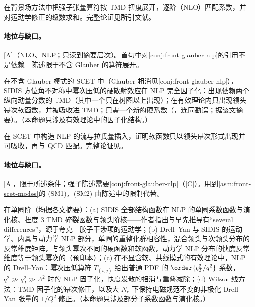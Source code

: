 \begin{proofsketch}
在背景场方法中把强子张量算符按 TMD 扭度展开，逐阶（NLO）匹配系数，并对运动学修正的级数求和。完整论证见所引文献。
\end{proofsketch}

\paragraph{地位与缺口。}[A]（NLO、NLP；只读到摘要层次）。首句中对\cref{conj:front-glauber-nlp}的引用不是依赖：陈述限于不含 Glauber 的算符展开。

\begin{proposition}\label{prop:front-sidis-nlp}
在不含 Glauber 模式的 SCET 中（Glauber 相消见\cref{conj:front-glauber-nlp}），SIDIS 方位角不对称中幂次压低的硬散射效应在 NLP 完全因子化：出现依赖两个纵向动量分数的 TMD（其中一个只在树图以上出现）；在有效理论内只出现领头幂次软函数，并被吸收进 TMD；只需一个新的硬系数（\cite{Ebert:2021jhy}，连同勘误；据该文摘要）。（本命题只涉及有效理论中的因子化结构。）
\end{proposition}

\begin{proofsketch}
在 SCET 中构造 NLP 的流与拉氏量插入，证明软函数只以领头幂次形式出现并可吸收，再与 QCD 匹配。完整论证见\cite{Ebert:2021jhy}。
\end{proofsketch}

\paragraph{地位与缺口。}[A]，限于所述条件；强子陈述需要\cref{conj:front-glauber-nlp}（[C]）。用到\cref{asm:front-scet-modes}的 (SM1)，(SM2) 由陈述中的限制代替。

\begin{proposition}\label{prop:front-nlp-tmd-oneloop}
在单圈阶（均据各文摘要）：(a) SIDIS 全部结构函数在 NLP 的单圈系数函数与演化核、扭度 3 TMD 碎裂函数与领头阶核——作者指出与早先推导有“several differences”，源于夸克—胶子干涉项的运动学\cite{Rodini:2023plb}；(b) Drell--Yan 与 SIDIS 的运动学、内禀与动力学 NLP 部分，单圈的重整化群相容性，混合领头与次领头分布的反常维度矩阵，与领头幂次不同的硬函数和软函数，动力学 NLP 分布的快度反常维度等于领头幂次的\cite{Gamberg:2022lju}（预印本）；(c) 在不显含软、共线模式的有效理论中，NLP 的 Drell--Yan：幂次压低算符 $T_{(i,j)}$ 给出普通 PDF 的 $\order{q_T^2/q^2}$ 系数，$q^2\gg q_T^2\gg\Lambda^2$ 时的 NLP 因子化，快度发散的相消与重叠减除\cite{Inglis-Whalen:2021bea}；(d) Wilson 线方法：TMD 因子化的幂次修正\cite{Balitsky:2017flc,Balitsky:2017gis}，以及大 $N_c$ 下保持电磁规范不变的非极化 Drell--Yan 张量的 $1/Q^2$ 修正\cite{Balitsky:2024ozy}。（本命题只涉及部分子系数函数与演化核。）
\end{proposition}

